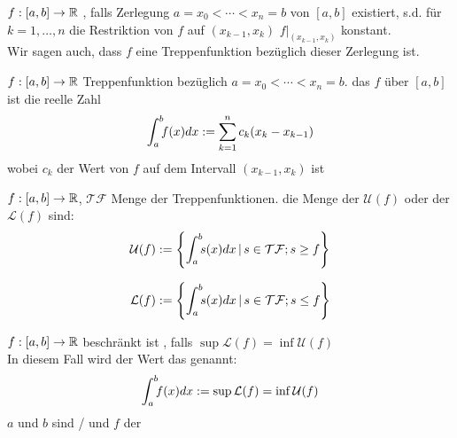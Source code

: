 \Def $f: [a, b] \to \mathbb{R}$ , falls Zerlegung $a = x_0 < \cdots < x_n = b$
von $[a, b]$ existiert, s.d. für $k = 1, \ldots, n$ die Restriktion von $f$ auf $(x_{k-1}, x_k)$
$f\Big|_{(x_{k-1}, x_k)}$ konstant. \\
Wir sagen auch, dass $f$ eine Treppenfunktion bezüglich dieser Zerlegung ist.

\Def $f: [a, b] \to \mathbb{R}$ Treppenfunktion bezüglich $a = x_0 < \cdots < x_n = b$. das
 $f$ über $[a, b]$ ist die reelle Zahl
$$\int_a^b \hspace{-4pt} f(x) dx := \sum_{k=1}^{n} c_k(x_k - x_{k-1})$$
wobei $c_k$ der Wert von $f$ auf dem Intervall $(x_{k-1}, x_k)$ ist

\Def $f: [a,b] \to \mathbb{R}$, $\mathcal{TF}$ Menge der Treppenfunktionen.
die Menge der  $\mathcal U (f)$ oder der 
$\mathcal L (f)$ sind:
$$\mathcal U (f) := \left\{\int_a^b \hspace{-4pt}s(x)dx \, | \, s \in \mathcal{TF}; s \ge f\right\}$$

$$\mathcal L (f) := \left\{\int_a^b \hspace{-4pt}s(x)dx \, | \, s \in \mathcal{TF}; s \le f\right\}$$

\Def $f: [a, b] \to \mathbb{R}$ beschränkt ist ,
falls $\sup \mathcal L (f) = \inf \mathcal U (f)$ \\
In diesem Fall wird der Wert das  genannt:
$$\int_a^b \hspace{-4pt}f(x) dx := \sup \mathcal L (f) = \inf \mathcal U (f)$$
$a$ und $b$ sind / und $f$ der 

